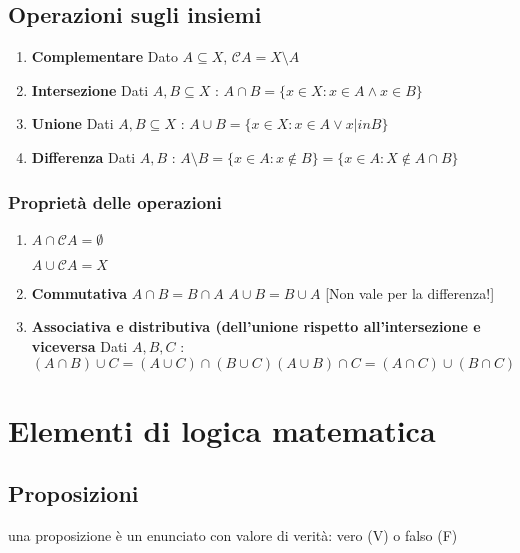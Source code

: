 \documentclass[10pt]{article}
\theoremstyle{plain}
\begin{document}
\subsection{Operazioni sugli insiemi}

\begin{enumerate}
\item \textbf{Complementare} Dato $A \subseteq X$, $\mathcal{C}A = X \setminus A$
\item \textbf{Intersezione} Dati $A, B \subseteq X$ : $A \cap B = \{x \in X : x \in A \land x \in B\}$
\item \textbf{Unione} Dati $A, B \subseteq X$ : $A \cup B = \{x \in X : x \in A \lor x |in B\}$
\item \textbf{Differenza} Dati $A, B$ : $A \setminus B = \{x \in A : x \notin B\} = \{x \in A : X \notin A \cap B \}$
\end{enumerate}
\subsubsection{Proprietà delle operazioni}
\begin{enumerate}
\item \hypertarget{nullo}{$A \cap \mathcal{C}A = \emptyset$}  $A \cup \mathcal{C}A = X$
\item \textbf{Commutativa} $A \cap B = B \cap A$  $A \cup B = B \cup A$ [Non vale per la differenza!]
\item \textbf{Associativa e distributiva (dell'unione rispetto all'intersezione e viceversa} Dati $A, B, C$ : \[(A \cap B) \cup C = (A \cup C) \cap (B \cup C) {   } (A \cup B) \cap C = (A \cap C) \cup (B \cap C)\]
\end{enumerate}
\section{Elementi di logica matematica}
\subsection*{Proposizioni}
\begin{defin}una proposizione è un enunciato con valore di verità: vero (V) o falso (F)
\end{defin}
\end{document}

